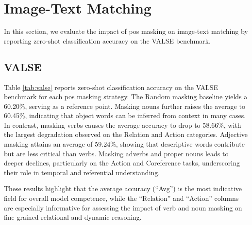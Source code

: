 \section{Image-Text Matching}
In this section, we evaluate the impact of \acrshort{pos} masking on image-text matching by reporting zero-shot classification accuracy on the VALSE benchmark.

\subsection{VALSE}
Table \ref{tab:valse} reports zero‐shot classification accuracy on the VALSE benchmark for each \acrshort{pos} masking strategy.  
The Random masking baseline yields a 60.20\%, serving as a reference point.  
Masking nouns further raises the average to 60.45\%, indicating that object words can be inferred from context in many cases.  
In contrast, masking verbs causes the average accuracy to drop to 58.66\%, with the largest degradation observed on the Relation and Action categories.  
Adjective masking attains an average of 59.24\%, showing that descriptive words contribute but are less critical than verbs.  
Masking adverbs and proper nouns leads to deeper declines, particularly on the Action and Coreference tasks, underscoring their role in temporal and referential understanding.  

These results highlight that the average accuracy (“Avg”) is the most indicative field for overall model competence, while the “Relation” and “Action” columns are especially informative for assessing the impact of verb and noun masking on fine‐grained relational and dynamic reasoning.

